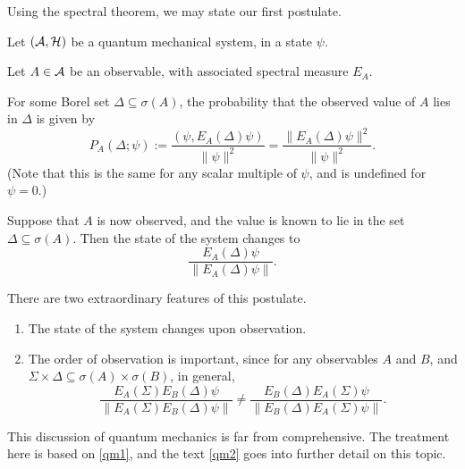 Using the spectral theorem, we may state our first postulate.
\begin{postulate}
\label{pos1}
    Let $(\mathcal{A},\mathcal{H})$ be a quantum mechanical system, in a state $\psi$. 
    
    Let $A \in \mathcal{A}$ be an observable, with associated spectral measure $E_A$. 
    
    For some Borel set $\Delta \subseteq \sigma(A)$, the probability 
    that the observed value of $A$ lies in $\Delta$ is given by
    \begin{equation*}
        P_A(\Delta;\psi) := \frac{(\psi,E_A(\Delta)\psi)}{\|\psi\|^2} = \frac{\|E_A(\Delta)\psi\|^2}{\|\psi\|^2}.
    \end{equation*}
    (Note that this is the same for any scalar multiple of $\psi$, and is undefined
    for $\psi = 0$.)
    
    Suppose that $A$ is now observed, and the value is known to lie
    in the set $\Delta \subseteq \sigma(A)$. Then the state
    of the system changes to
    \begin{equation*}
        \frac{E_A(\Delta)\psi}{\|E_A(\Delta)\psi\|}.
    \end{equation*}
\end{postulate}

\begin{remark}
    There are two extraordinary features of this postulate.
    \begin{enumerate}
        \item{} The state of the system changes upon observation.
        \item{} The order of observation is important, since
        for any observables $A$ and $B$, and $\Sigma \times \Delta \subseteq \sigma(A)\times\sigma(B)$, 
        in general,
        \begin{equation*}
            \frac{E_A(\Sigma)E_B(\Delta)\psi}{\|E_A(\Sigma)E_B(\Delta)\psi\|} \neq \frac{E_B(\Delta)E_A(\Sigma)\psi}{\|E_B(\Delta)E_A(\Sigma)\psi\|}.
        \end{equation*}
    \end{enumerate}
\end{remark}

\begin{remark}
    This discussion of quantum mechanics is far from comprehensive. The 
    treatment here is based on \ref{qm1}, and the text \ref{qm2}
    goes into further detail on this topic.
\end{remark}


